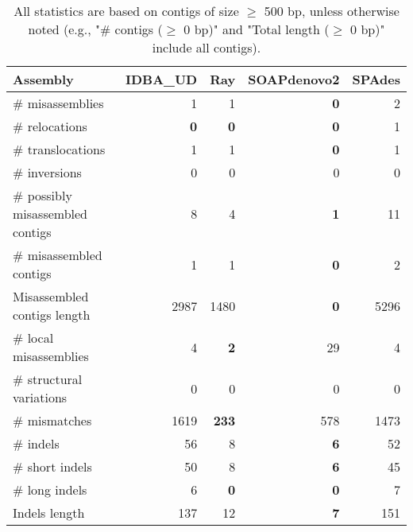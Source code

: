 \documentclass[12pt,a4paper]{article}
\begin{document}
\begin{table}[ht]
\begin{center}
\caption{All statistics are based on contigs of size $\geq$ 500 bp, unless otherwise noted (e.g., "\# contigs ($\geq$ 0 bp)" and "Total length ($\geq$ 0 bp)" include all contigs).}
\begin{tabular}{|l*{4}{|r}|}
\hline
Assembly & IDBA\_UD & Ray & SOAPdenovo2 & SPAdes \\ \hline
\# misassemblies & 1 & 1 & {\bf 0} & 2 \\ \hline
\hspace{5mm}\# relocations & {\bf 0} & {\bf 0} & {\bf 0} & 1 \\ \hline
\hspace{5mm}\# translocations & 1 & 1 & {\bf 0} & 1 \\ \hline
\hspace{5mm}\# inversions & 0 & 0 & 0 & 0 \\ \hline
\# possibly misassembled contigs & 8 & 4 & {\bf 1} & 11 \\ \hline
\# misassembled contigs & 1 & 1 & {\bf 0} & 2 \\ \hline
Misassembled contigs length & 2987 & 1480 & {\bf 0} & 5296 \\ \hline
\# local misassemblies & 4 & {\bf 2} & 29 & 4 \\ \hline
\# structural variations & 0 & 0 & 0 & 0 \\ \hline
\# mismatches & 1619 & {\bf 233} & 578 & 1473 \\ \hline
\# indels & 56 & 8 & {\bf 6} & 52 \\ \hline
\hspace{5mm}\# short indels & 50 & 8 & {\bf 6} & 45 \\ \hline
\hspace{5mm}\# long indels & 6 & {\bf 0} & {\bf 0} & 7 \\ \hline
Indels length & 137 & 12 & {\bf 7} & 151 \\ \hline
\end{tabular}
\end{center}
\end{table}
\end{document}
